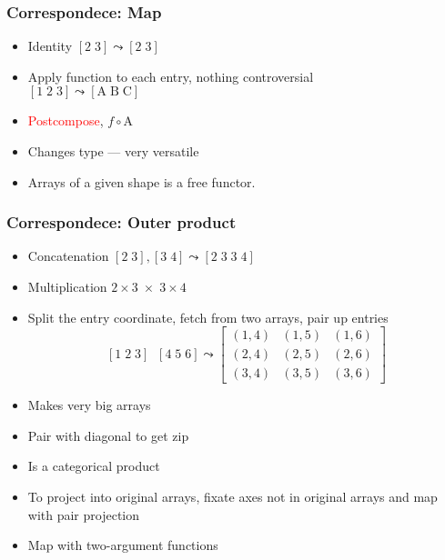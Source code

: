\documentclass[xetex,mathserif,serif]{beamer}
\newcommand\mrm[1]{\mathrm{#1}}
\newcommand\brm[1]{\bm{\mrm{#1}}}
\newcommand\oprodby[1]{\mathop{\operatorname*{\,\brm{by}}_{#1}}}
\newcommand\NB[1]{\textcolor{red}{#1}}
\begin{document}
\begin{frame}
  \frametitle{Correspondece: Map}
  \pause
  \begin{itemize}[<+->]
    \item Identity \([2\;3] \leadsto [2\;3]\)
    \item Apply function to each entry, nothing controversial\\
      \([1\;2\;3] \leadsto [\mrm A\;\mrm B\;\mrm C]\)
    \item \NB{Postcompose}, \(f \circ \brm A\)
    \item Changes type --- very versatile
    \item Arrays of a given shape is a free functor.
  \end{itemize}
\end{frame}

\begin{frame}
  \frametitle{Correspondece: Outer product}
  \pause
  \begin{itemize}[<+->]
    \item Concatenation \([2\;3], [3\;4] \leadsto [2\;3\;3\;4]\)
    \item Multiplication \(2\times3 \;\times\; 3\times4\)
    \item Split the entry coordinate, fetch from two arrays, pair up
      entries
      \[[1\;2\;3] \oprodby{} [4\;5\;6] \leadsto
      \begin{bmatrix}
        (1,4) & (1,5) & (1,6) \\
        (2,4) & (2,5) & (2,6) \\
        (3,4) & (3,5) & (3,6)
      \end{bmatrix}\]
    \item Makes very big arrays
    \item Pair with diagonal to get zip
    \item Is a categorical product
    \item To project into original arrays, fixate axes not in original
      arrays and map with pair projection
    \item Map with two-argument functions
  \end{itemize}
\end{frame}
\end{document}

